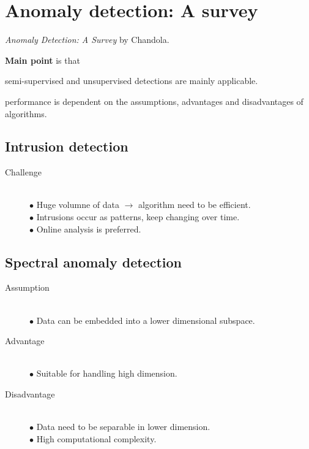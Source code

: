 \section{Anomaly detection: A survey}
\label{ch:chandola2009}

\textit{Anomaly Detection: A Survey} by Chandola.
\newline

\textbf{Main point} is that \begin{inparaenum}
\item semi-supervised and unsupervised detections are mainly applicable.
\item performance is dependent on the assumptions, advantages and disadvantages of algorithms.
\end{inparaenum}

\subsection{Intrusion detection}
\begin{description}
\item[Challenge] \hfill \\
$\bullet$ Huge volumne of data $\rightarrow$ algorithm need to be efficient. \\
$\bullet$ Intrusions occur as patterns, keep changing over time. \\
$\bullet$ Online analysis is preferred. \\
\end{description}

\subsection{Spectral anomaly detection}
\begin{description}
\item[Assumption] \hfill \\
$\bullet$ Data can be embedded into a lower dimensional subspace. \\

\item[Advantage] \hfill \\
$\bullet$ Suitable for handling high dimension. \\

\item[Disadvantage] \hfill \\
$\bullet$ Data need to be separable in lower dimension. \\
$\bullet$ High computational complexity. \\
\end{description}
